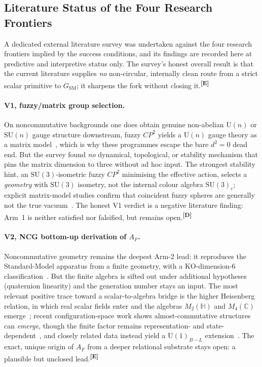 \documentclass[12pt,a4paper,twoside]{article}
\theoremstyle{plain}
\theoremstyle{definition}
\theoremstyle{remark}
\newcommand{\catmark}[1]{\textsuperscript{\textsf{\textbf{[#1]}}}}
\begin{document}
\subsection{Literature Status of the Four Research Frontiers}
\label{subsec:v4-literature-status}

A dedicated external literature survey was undertaken against the four research frontiers implied by the success conditions, and its findings are recorded here at predictive and interpretive status only. The survey's honest overall result is that the current literature supplies \emph{no} non-circular, internally clean route from a strict scalar primitive to $G_{\mathrm{SM}}$; it sharpens the fork without closing it.\catmark{E}

\paragraph{V1, fuzzy/matrix group selection.}
On noncommutative backgrounds one does obtain genuine non-abelian $\mathrm{U}(n)$ or $\mathrm{SU}(n)$ gauge structure downstream, fuzzy $CP^2$ yields a $\mathrm{U}(n)$ gauge theory as a matrix model~\cite{grosse2005}, which is why these programmes escape the bare $d^2=0$ dead end. But the survey found \emph{no} dynamical, topological, or stability mechanism that pins the matrix dimension to three without ad hoc input. The strongest stability hint, an $\mathrm{SU}(3)$-isometric fuzzy $CP^2$ minimising the effective action, selects a \emph{geometry} with $\mathrm{SU}(3)$ isometry, not the internal colour algebra $\mathrm{SU}(3)_c$; explicit matrix-model studies confirm that coincident fuzzy spheres are generally not the true vacuum~\cite{azuma2004}. The honest V1 verdict is a negative literature finding: Arm~1 is neither satisfied nor falsified, but remains open.\catmark{D}

\paragraph{V2, NCG bottom-up derivation of $A_F$.}
Noncommutative geometry remains the deepest Arm-2 lead: it reproduces the Standard-Model apparatus from a finite geometry, with a KO-dimension-6 classification~\cite{cc2008}. But the finite algebra is sifted out under additional hypotheses (quaternion linearity) and the generation number stays an input. The most relevant positive trace toward a scalar-to-algebra bridge is the higher Heisenberg relation, in which real scalar fields enter and the algebras $M_2(\mathbb{H})$ and $M_4(\mathbb{C})$ emerge~\cite{ccm2015}; recent configuration-space work shows almost-commutative structures can \emph{emerge}, though the finite factor remains representation- and state-dependent~\cite{aastrup2025}, and closely related data instead yield a $\mathrm{U}(1)_{B-L}$ extension~\cite{farnsworth2015}. The exact, unique origin of $A_F$ from a deeper relational substrate stays open: a plausible but unclosed lead.\catmark{E}
\end{document}
